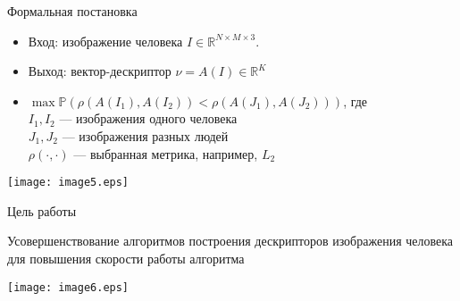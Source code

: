 \documentclass[14pt,mathserif,aspectratio=43]{beamer}
\begin{document}
\begin{frame}{Формальная постановка}

    \begin{itemize}
        \item Вход: изображение человека $I \in \mathbb{R}^{N \times M \times 3}$.
        \item Выход: вектор-дескриптор $\nu = A(I) \in \mathbb{R}^K$
        \item $\max \mathbb{P}(\rho(A(I_1), A(I_2)) < \rho(A(J_1), A(J_2)))$, где \\
        $I_1, I_2$ --- изображения одного человека\\
        $J_1, J_2$ --- изображения разных людей\\
        $\rho(\cdot, \cdot)$ --- выбранная метрика, например, $L_2$
    \end{itemize}
    
    \begin{center}
        \texttt{[image: image5.eps]}
    \end{center}
    
\end{frame}

\begin{frame}{Цель работы}

    Усовершенствование алгоритмов построения дескрипторов изображения человека для повышения скорости работы алгоритма
    
    \begin{center}
        \texttt{[image: image6.eps]}
    \end{center}
    
\end{frame}
\end{document}
